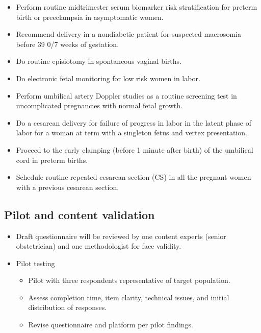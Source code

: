 \documentclass[
  letterpaper,
  DIV=11,
  numbers=noendperiod]{scrartcl}
\begin{document}
\begin{itemize}
\begin{itemize}
  \item
    Perform routine midtrimester serum biomarker risk stratification for
    preterm birth or preeclampsia in asymptomatic women.
  \item
    Recommend delivery in a nondiabetic patient for suspected macrosomia
    before 39 0/7 weeks of gestation.
  \item
    Do routine episiotomy in spontaneous vaginal births.
  \item
    Do electronic fetal monitoring for low risk women in labor.
  \item
    Perform umbilical artery Doppler studies as a routine screening test
    in uncomplicated pregnancies with normal fetal growth.
  \item
    Do a cesarean delivery for failure of progress in labor in the
    latent phase of labor for a woman at term with a singleton fetus and
    vertex presentation.
  \item
    Proceed to the early clamping (before 1 minute after birth) of the
    umbilical cord in preterm births.
  \item
    Schedule routine repeated cesarean section (CS) in all the pregnant
    women with a previous cesarean section.
  \end{itemize}
\end{itemize}

\subsection{Pilot and content
validation}\label{pilot-and-content-validation}

\begin{itemize}
\item
  Draft questionnaire will be reviewed by one content experts (senior
  obstetrician) and one methodologist for face validity.
\item
  Pilot testing

  \begin{itemize}
  \item
    Pilot with three respondents representative of target population.
  \item
    Assess completion time, item clarity, technical issues, and initial
    distribution of responses.
  \item
    Revise questionnaire and platform per pilot findings.
  \end{itemize}
\end{itemize}
\end{document}
